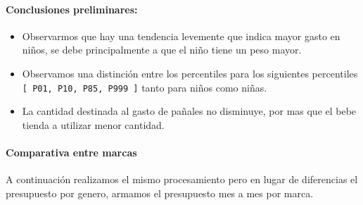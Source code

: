 \documentclass[
]{article}
\providecommand{\tightlist}{%
  \setlength{\itemsep}{0pt}\setlength{\parskip}{0pt}}
\begin{document}
\hypertarget{conclusiones-preliminares}{%
\paragraph{Conclusiones preliminares:}\label{conclusiones-preliminares}}

\begin{itemize}
\tightlist
\item
  Observarmos que hay una tendencia levemente que indica mayor gasto en
  niños, se debe principalmente a que el niño tiene un peso mayor.
\item
  Observamos una distinción entre los percentiles para los siguientes
  percentiles
  \texttt{{[}\ \textquotesingle{}P01\textquotesingle{},\ \textquotesingle{}P10\textquotesingle{},\ \textquotesingle{}P85\textquotesingle{},\ \textquotesingle{}P999\textquotesingle{}\ {]}}
  tanto para niños como niñas.
\item
  La cantidad destinada al gasto de pañales no disminuye, por mas que el
  bebe tienda a utilizar menor cantidad.
\end{itemize}

\hypertarget{comparativa-entre-marcas}{%
\paragraph{Comparativa entre marcas}\label{comparativa-entre-marcas}}

A continuación realizamos el mismo procesamiento pero en lugar de
diferencias el presupuesto por genero, armamos el presupuesto mes a mes
por marca.
\end{document}
